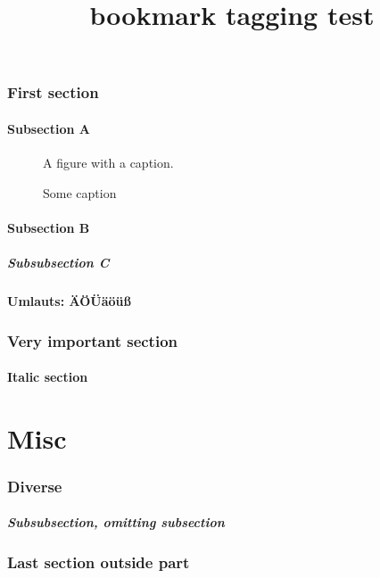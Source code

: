 \documentclass{article}
\title{bookmark tagging test}
\begin{document}
\section{First section}
\subsection{Subsection A}
\begin{figure}
  \hypertarget{fig}{}%
  A figure with a caption.
  \caption{Some caption}
\end{figure}
\subsection{Subsection B}
\subsubsection{Subsubsection C}
\subsection{Umlauts: \"A\"O\"U\"a\"o\"u\ss}
\newpage
{}
\section{Very important section}
\subsection{Italic section}
\part{Misc}
\section{Diverse}
\subsubsection{Subsubsection, omitting subsection}
\section{Last section outside part}
\end{document}
